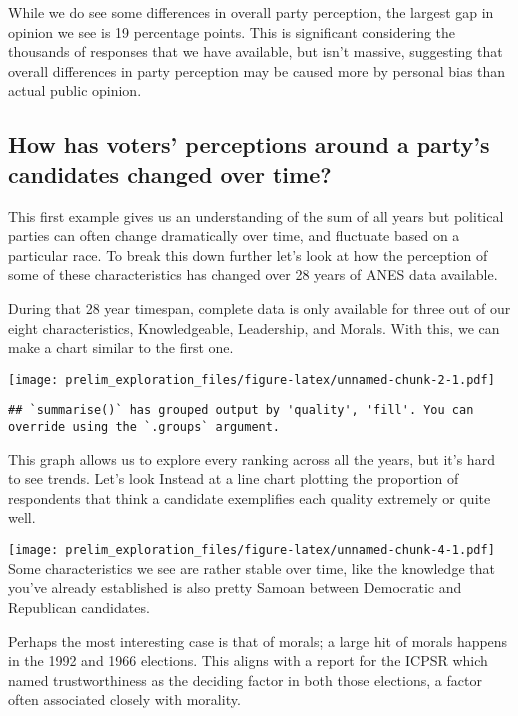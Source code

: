\documentclass[
]{article}
\begin{document}
While we do see some differences in overall party perception, the
largest gap in opinion we see is 19 percentage points. This is
significant considering the thousands of responses that we have
available, but isn't massive, suggesting that overall differences in
party perception may be caused more by personal bias than actual public
opinion.

\hypertarget{how-has-voters-perceptions-around-a-partys-candidates-changed-over-time}{%
\subsection{How has voters' perceptions around a party's candidates
changed over
time?}\label{how-has-voters-perceptions-around-a-partys-candidates-changed-over-time}}

This first example gives us an understanding of the sum of all years but
political parties can often change dramatically over time, and fluctuate
based on a particular race. To break this down further let's look at how
the perception of some of these characteristics has changed over 28
years of ANES data available.

During that 28 year timespan, complete data is only available for three
out of our eight characteristics, Knowledgeable, Leadership, and Morals.
With this, we can make a chart similar to the first one.

\texttt{[image: prelim\_exploration\_files/figure-latex/unnamed-chunk-2-1.pdf]}

\begin{verbatim}
## `summarise()` has grouped output by 'quality', 'fill'. You can override using the `.groups` argument.
\end{verbatim}

This graph allows us to explore every ranking across all the years, but
it's hard to see trends. Let's look Instead at a line chart plotting the
proportion of respondents that think a candidate exemplifies each
quality extremely or quite well.

\texttt{[image: prelim\_exploration\_files/figure-latex/unnamed-chunk-4-1.pdf]}
Some characteristics we see are rather stable over time, like the
knowledge that you've already established is also pretty Samoan between
Democratic and Republican candidates.

Perhaps the most interesting case is that of morals; a large hit of
morals happens in the 1992 and 1966 elections. This aligns with a report
for the ICPSR which named trustworthiness as the deciding factor in both
those elections, a factor often associated closely with morality.
\end{document}
